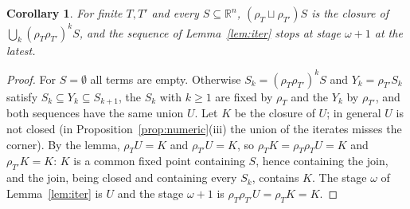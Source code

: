 \documentclass[11pt]{amsart}
\newtheorem{cor}[thm]{Corollary}
\theoremstyle{definition}
\begin{document}
\begin{cor}\label{cor:omega}
For finite $T,T'$ and every $S\subseteq\mathbb R^n$, $(\rho_T\sqcup
\rho_{T'})S$ is the closure of $\bigcup_k(\rho_T\rho_{T'})^kS$, and the
sequence of Lemma~\ref{lem:iter} stops at stage $\omega+1$ at the
latest.
\end{cor}
\begin{proof}
For $S=\emptyset$ all terms are empty. Otherwise $S_k=(\rho_T\rho_{T'})
^kS$ and $Y_k=\rho_{T'}S_k$ satisfy $S_k\subseteq Y_k\subseteq S_{k+1}$,
the $S_k$ with $k\ge1$ are fixed by $\rho_T$ and the $Y_k$ by
$\rho_{T'}$, and both sequences have the same union $U$. Let $K$ be the
closure of $U$; in general $U$ is not closed (in
Proposition~\ref{prop:numeric}(iii) the union of the iterates misses
the corner). By the lemma, $\rho_TU=K$ and $\rho_{T'}U=K$, so $\rho_TK=
\rho_T\rho_TU=K$ and $\rho_{T'}K=K$: $K$ is a common fixed point
containing $S$, hence containing the join, and the join, being closed
and containing every $S_k$, contains $K$. The stage $\omega$ of
Lemma~\ref{lem:iter} is $U$ and the stage $\omega+1$ is $\rho_T
\rho_{T'}U=\rho_TK=K$.
\end{proof}
\end{document}
